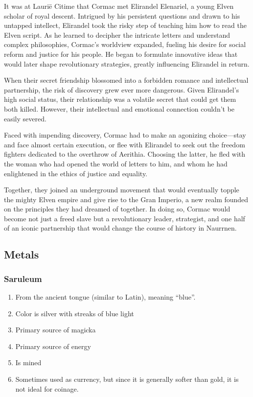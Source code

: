 \documentclass[11pt]{article}
\begin{document}
\begin{enumerate}
\begin{enumerate}
\begin{enumerate}
It was at Laurië Citime that Cormac met Elirandel Elenariel, a young Elven scholar of royal descent. Intrigued by his persistent questions and drawn to his untapped intellect, Elirandel took the risky step of teaching him how to read the Elven script. As he learned to decipher the intricate letters and understand complex philosophies, Cormac's worldview expanded, fueling his desire for social reform and justice for his people. He began to formulate innovative ideas that would later shape revolutionary strategies, greatly influencing Elirandel in return.

When their secret friendship blossomed into a forbidden romance and intellectual partnership, the risk of discovery grew ever more dangerous. Given Elirandel's high social status, their relationship was a volatile secret that could get them both killed. However, their intellectual and emotional connection couldn't be easily severed.

Faced with impending discovery, Cormac had to make an agonizing choice—stay and face almost certain execution, or flee with Elirandel to seek out the freedom fighters dedicated to the overthrow of Aerithia. Choosing the latter, he fled with the woman who had opened the world of letters to him, and whom he had enlightened in the ethics of justice and equality.

Together, they joined an underground movement that would eventually topple the mighty Elven empire and give rise to the Gran Imperio, a new realm founded on the principles they had dreamed of together. In doing so, Cormac would become not just a freed slave but a revolutionary leader, strategist, and one half of an iconic partnership that would change the course of history in Naurrnen.
\end{enumerate}
\end{enumerate}
\end{enumerate}

\subsection{Metals}
\label{sec:orgb8cee96}
\subsubsection{Saruleum}
\label{sec:orgac2298f}
\begin{enumerate}
\item From the ancient tongue (similar to Latin), meaning ``blue''.
\item Color is silver with streaks of blue light
\item Primary source of magicka
\item Primary source of energy
\item Is mined
\item Sometimes used as currency, but since it is generally softer than gold, it is not ideal for coinage.
\end{enumerate}
\end{document}
